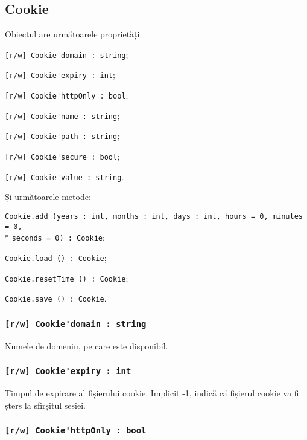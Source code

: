 \subsection{{\color{orange} Cookie}}

Obiectul \cookie{} are următoarele proprietăți:
\begin{icItems}
	\item \lstinline|[r/w] Cookie'domain : string|;
	\item \lstinline|[r/w] Cookie'expiry : int|;
	\item \lstinline|[r/w] Cookie'httpOnly : bool|;
	\item \lstinline|[r/w] Cookie'name : string|;
	\item \lstinline|[r/w] Cookie'path : string|;
	\item \lstinline|[r/w] Cookie'secure : bool|;
	\item \lstinline|[r/w] Cookie'value : string|.
\end{icItems}

Și următoarele metode:
\begin{icItems}
	\item \lstinline|Cookie.add (years : int, months : int, days : int, hours = 0, minutes = 0,|\\* \lstinline|seconds = 0) : Cookie|;
	\item \lstinline|Cookie.load () : Cookie|;
	\item \lstinline|Cookie.resetTime () : Cookie|;
	\item \lstinline|Cookie.save () : Cookie|.
\end{icItems}

\subsubsection{\lstinline|[r/w] Cookie'domain : string|}

Numele de domeniu, pe care \cookie{} este disponibil.

\subsubsection{\lstinline|[r/w] Cookie'expiry : int|}

Timpul de expirare al fișierului cookie. Implicit -1, indică că fișierul cookie va fi șters la sfîrșitul sesiei.

\subsubsection{\lstinline|[r/w] Cookie'httpOnly : bool|}

